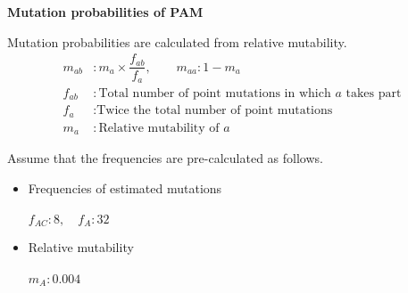\question \textbf{Mutation probabilities of PAM}

Mutation probabilities are calculated from relative mutability.
\begin{align*}
m_{ab} &: m_a \times \dfrac{f_{ab}}{f_a},  \quad \quad  m_{aa} : 1 - m_a \\
f_{ab} &:  \text{Total number of point mutations in which } a \text{ takes part}  \\
f_a &:  \text{Twice the total number of point mutations} \\ 
m_a &: \text{Relative mutability of } a 
\end{align*}

\noindent
Assume that the frequencies are pre-calculated as follows.
\begin{itemize}
\item Frequencies of estimated mutations \\ \\
 $f_{AC}: 8, \quad f_A: 32$ \\

\item Relative mutability \\ \\
 $m_A: 0.004 $
 
\end{itemize}


